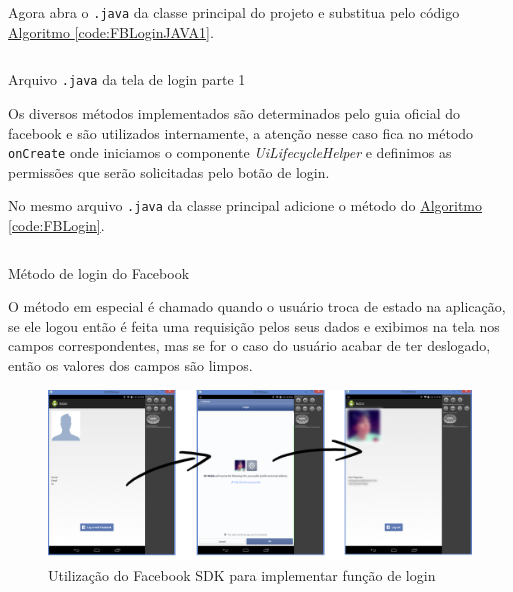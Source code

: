 \documentclass[a4paper,12pt,brazil,oneside]{book}
\begin{document}
	Agora abra o \texttt{.java} da classe principal do projeto e substitua pelo código \hyperref[code:FBLoginJAVA1]{Algoritmo \ref*{code:FBLoginJAVA1}}.
	
	\begin{listing}[H]
	\inputminted[linenos=true,fontsize=\small,frame=lines, framesep=2mm, tabsize=2,numbersep=5pt]{xml}{src/facebook/loginMainActivity.java}
	\caption{Arquivo \texttt{.java} da tela de login parte 1}
	\label{code:FBLoginJAVA1}
	\end{listing}
	
	Os diversos métodos implementados são determinados pelo guia oficial do facebook e são utilizados internamente, a atenção nesse caso fica no método \texttt{onCreate} onde iniciamos o componente \emph{UiLifecycleHelper} e definimos as permissões que serão solicitadas pelo botão de login.
	
	No mesmo arquivo \texttt{.java} da classe principal adicione o método do \hyperref[code:FBLogin]{Algoritmo \ref*{code:FBLogin}}.
	
	\begin{listing}[H]
	\inputminted[linenos=true,fontsize=\small,frame=lines, framesep=2mm, tabsize=2,numbersep=5pt]{xml}{src/facebook/onSessionStateChanged.java}
	\caption{Método de login do Facebook}
	\label{code:FBLogin}
	\end{listing}
	
	O método em especial é chamado quando o usuário troca de estado na aplicação, se ele logou então é feita uma requisição pelos seus dados e exibimos na tela nos campos correspondentes, mas se for o caso do usuário acabar de ter deslogado, então os valores dos campos são limpos.
	
	\begin{figure}[H]
  \centering
  \includegraphics[width=1\textwidth]{figuras/facebook/face.png}
  \caption{Utilização do Facebook SDK para implementar função de login}
  \label{fig:facebookLogin}
\end{figure}
\end{document}
